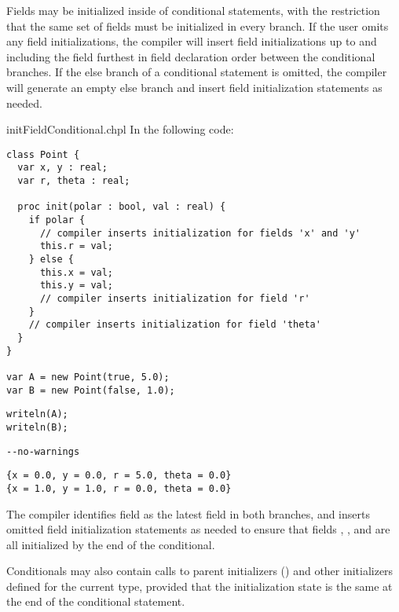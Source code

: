 Fields may be initialized inside of conditional statements, with the
restriction that the same set of fields must be initialized in every branch.
If the user omits any field initializations, the compiler will insert field
initializations up to and including the field furthest in field declaration
order between the conditional branches. If the else branch of a conditional
statement is omitted, the compiler will generate an empty else branch and
insert field initialization statements as needed.

\begin{chapelexample}{initFieldConditional.chpl}
In the following code:
\begin{chapel}
\begin{verbatim}
class Point {
  var x, y : real;
  var r, theta : real;

  proc init(polar : bool, val : real) {
    if polar {
      // compiler inserts initialization for fields 'x' and 'y'
      this.r = val;
    } else {
      this.x = val;
      this.y = val;
      // compiler inserts initialization for field 'r'
    }
    // compiler inserts initialization for field 'theta'
  }
}

var A = new Point(true, 5.0);
var B = new Point(false, 1.0);
\end{verbatim}
\end{chapel}
\begin{chapelpost}
\begin{verbatim}
writeln(A);
writeln(B);
\end{verbatim}
\end{chapelpost}
\begin{chapelcompopts}
\begin{verbatim}
--no-warnings
\end{verbatim}
\end{chapelcompopts}
\begin{chapeloutput}
\begin{verbatim}
{x = 0.0, y = 0.0, r = 5.0, theta = 0.0}
{x = 1.0, y = 1.0, r = 0.0, theta = 0.0}
\end{verbatim}
\end{chapeloutput}

The compiler identifies field  as the latest field in both branches,
and inserts omitted field initialization statements as needed to ensure that
fields , , and  are all initialized by the end of the
conditional.
\end{chapelexample}

Conditionals may also contain calls to parent initializers
() and other initializers defined for the current
type, provided that the initialization state is the same at the end of the
conditional statement.

